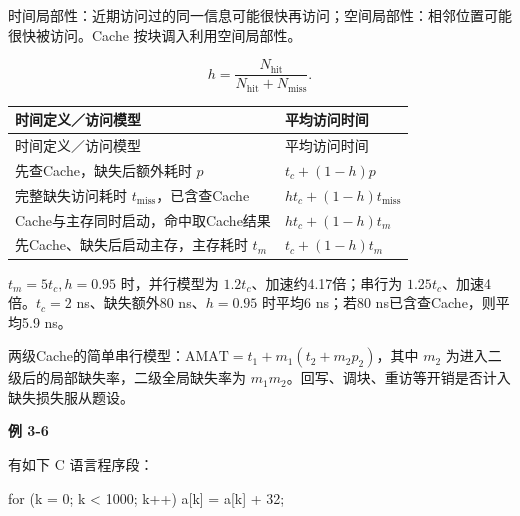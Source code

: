 时间局部性：近期访问过的同一信息可能很快再访问；空间局部性：相邻位置可能很快被访问。Cache 按块调入利用空间局部性。

\[h=\frac{N_{\mathrm{hit}}}{N_{\mathrm{hit}}+N_{\mathrm{miss}}}.\]

\par\smallskip
{\fontsize{9.3}{12}\selectfont\setlength{\tabcolsep}{2.5pt}\setlength{\LTleft}{0pt}\setlength{\LTright}{0pt}
\begin{longtable}{@{}>{\raggedright\arraybackslash}p{}>{\raggedright\arraybackslash}p{}@{}}
\toprule
时间定义／访问模型 & 平均访问时间 \\

\midrule\endfirsthead\toprule
时间定义／访问模型 & 平均访问时间 \\

\midrule\endhead\bottomrule\endfoot
先查Cache，缺失后额外耗时 \(p\) & \(t_c+(1-h)p\) \\

完整缺失访问耗时 \(t_{\mathrm{miss}}\)，已含查Cache & \(ht_c+(1-h)t_{\mathrm{miss}}\) \\

Cache与主存同时启动，命中取Cache结果 & \(ht_c+(1-h)t_m\) \\

先Cache、缺失后启动主存，主存耗时 \(t_m\) & \(t_c+(1-h)t_m\) \\

\end{longtable}}
\par\smallskip

\(t_m=5t_c,h=0.95\) 时，并行模型为 \(1.2t_c\)、加速约4.17倍；串行为 \(1.25t_c\)、加速4倍。\(t_c=2\) ns、缺失额外80 ns、\(h=0.95\) 时平均6 ns；若80 ns已含查Cache，则平均5.9 ns。

两级Cache的简单串行模型：\(\mathrm{AMAT}=t_1+m_1(t_2+m_2p_2)\)，其中 \(m_2\) 为进入二级后的局部缺失率，二级全局缺失率为 \(m_1m_2\)。回写、调块、重访等开销是否计入缺失损失服从题设。

\par\medskip{}\noindent\hypertarget{CO03-E06}{}\label{CO03-E06}\textbf{例 3-6}\par\nobreak\smallskip

有如下 C 语言程序段：

\par\smallskip\noindent\begin{minipage}{\linewidth}
\begin{codeblock}[language={C}]
for (k = 0; k < 1000; k++)
    a[k] = a[k] + 32;
\end{codeblock}
\end{minipage}\par\smallskip

